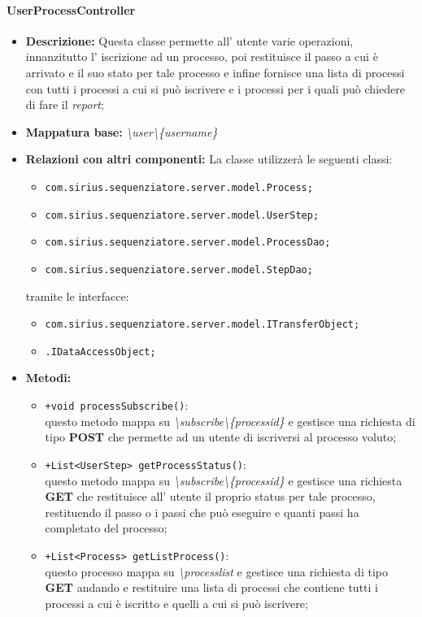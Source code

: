 \paragraph{UserProcessController}%
\begin{itemize}
	\item \textbf{Descrizione: } Questa classe permette all' utente varie operazioni, innanzitutto l' iscrizione ad un processo, poi restituisce il passo a cui è arrivato e il suo stato per tale processo e infine fornisce una lista di processi con tutti i processi a cui si può iscrivere e i processi per i quali può chiedere di fare il \textit{report};
	\item \textbf{Mappatura base: } \textit{\textbackslash user\textbackslash \{username\}}
	\item \textbf{Relazioni con altri componenti: }
	La classe utilizzerà le seguenti classi:
	\begin{itemize}
		\item \texttt{com.sirius.sequenziatore.server.model.Process;}
		\item \texttt{com.sirius.sequenziatore.server.model.UserStep;}
		\item \texttt{com.sirius.sequenziatore.server.model.ProcessDao;}
		\item \texttt{com.sirius.sequenziatore.server.model.StepDao;}
	\end{itemize}
	tramite le interfacce:
	\begin{itemize}
		\item \texttt{com.sirius.sequenziatore.server.model.ITransferObject;}
		\item \texttt{\sModel .IDataAccessObject;}
	\end{itemize}
	\item \textbf{Metodi: }\begin{itemize}
					\item \texttt{+void processSubscribe()}:\\
					questo metodo mappa su \textit{\textbackslash subscribe\textbackslash \{processid\}} e gestisce una richiesta di tipo \textbf{POST} che permette ad un utente di iscriversi al processo voluto;
					\item \texttt{+List<UserStep> getProcessStatus()}:\\
					questo metodo mappa su \textit{\textbackslash subscribe\textbackslash \{processid\}} e gestisce una richiesta \textbf{GET} che restituisce all' utente il proprio status per tale processo, restituendo il passo o i passi che può eseguire e quanti passi ha completato del processo;
					\item \texttt{+List<Process> getListProcess()}:\\
					questo processo mappa su \textit{\textbackslash processlist} e gestisce una richiesta di tipo \textbf{GET} andando e restituire una lista di processi che contiene tutti i processi  a cui è iscritto e quelli a cui si può iscrivere;
				\end{itemize}
\end{itemize}
